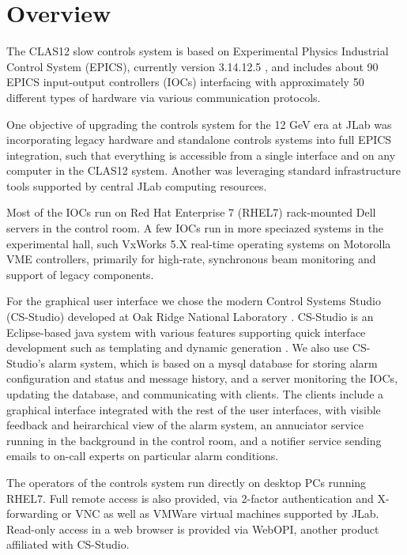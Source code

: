 \section{Overview}

The CLAS12 slow controls system is based on Experimental Physics Industrial Control System (EPICS), currently version 3.14.12.5 \cite{epics-website}, and includes about 90 EPICS input-output controllers (IOCs) interfacing with approximately 50 different types of hardware via various communication protocols.

One objective of upgrading the controls system for the 12 GeV era at JLab was incorporating legacy hardware and standalone controls systems into full EPICS integration, such that everything is accessible from a single interface and on any computer in the CLAS12 system.  Another was leveraging standard infrastructure tools supported by central JLab computing resources.

Most of the IOCs run on Red Hat Enterprise 7 (RHEL7) rack-mounted Dell servers in the control room.  A few IOCs run in more speciazed systems in the experimental hall, such VxWorks 5.X real-time operating systems on Motorolla VME controllers, primarily for high-rate, synchronous beam monitoring and support of legacy components.

For the graphical user interface we chose the modern Control Systems Studio (CS-Studio) developed at Oak Ridge National Laboratory \cite{css-website}.   CS-Studio is an Eclipse-based java system with various features supporting quick interface development such as templating and dynamic generation \cite{css-website}.  We also use CS-Studio's alarm system, which is based on a mysql database for storing alarm configuration and status and message history, and a server monitoring the IOCs, updating the database, and communicating with clients.  The clients include a graphical interface integrated with the rest of the user interfaces, with visible feedback and heirarchical view of the alarm system, an annuciator service running in the background in the control room, and a notifier service sending emails to on-call experts on particular alarm conditions.

The operators of the controls system run directly on desktop PCs running RHEL7.  Full remote access is also provided, via 2-factor authentication and X-forwarding or VNC as well as VMWare virtual machines supported by JLab.  Read-only access in a web browser is provided via WebOPI, another product affiliated with CS-Studio.

